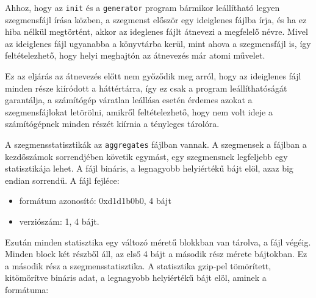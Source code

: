Ahhoz, hogy az \texttt{init} és a \texttt{generator} program bármikor leállítható legyen szegmensfájl írása közben, a szegmenst először egy ideiglenes fájlba írja, és ha ez hiba nélkül megtörtént, akkor az ideglenes fájlt átnevezi a megfelelő névre.
Mivel az ideiglenes fájl ugyanabba a könyvtárba kerül, mint ahova a szegmensfájl is, így feltételezhető, hogy helyi meghajtón az átnevezés már atomi művelet.

Ez az eljárás az átnevezés előtt nem győződik meg arról, hogy az ideiglenes fájl minden része
kiíródott a háttértárra, így ez csak a program leállíthatóságát garantálja, a számítógép váratlan leállása esetén érdemes azokat a szegmensfájlokat letörölni, amikről feltételezhető, hogy nem volt ideje a számítógépnek minden részét kiírnia a tényleges tárolóra.

A szegmensstatisztikák az \texttt{aggregates} fájlban vannak.
A szegmensek a fájlban a kezdőszámok sorrendjében követik egymást, egy szegmensnek legfeljebb egy statisztikája lehet.
A fájl bináris, a legnagyobb helyiértékű bájt elöl, azaz big endian sorrendű. A fájl fejléce:
\begin{itemize}
\item formátum azonosító: 0xd1d1b0b0, 4 bájt
\item verziószám: 1, 4 bájt.
\end{itemize}
Ezután minden statisztika egy változó méretű blokkban van tárolva, a fájl végéig.
Minden block két részből áll, az első 4 bájt a második rész mérete bájtokban.
Ez a második rész a szegmensstatisztika.
A statisztika gzip-pel tömörített, kitömörítve bináris adat, a legnagyobb helyiértékű bájt elöl, aminek a formátuma:
